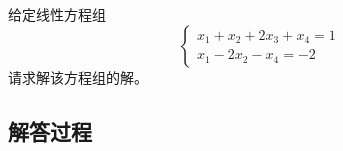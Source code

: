 \begin{example}[线性方程组求解]
    给定线性方程组  
    \[
    \begin{cases}
    x_1 + x_2 + 2x_3 + x_4 = 1 \\
    x_1 - 2x_2 - x_4 = -2
    \end{cases}
    \]
    请求解该方程组的解。
    \end{example}
    
    \subsection*{解答过程}
